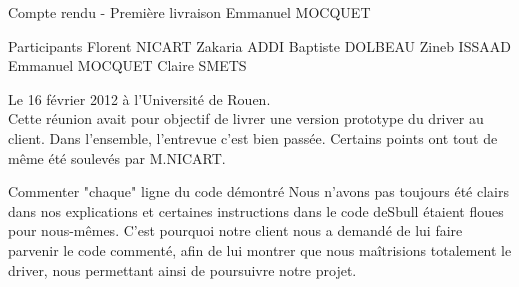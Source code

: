 Compte rendu - Première livraison
Emmanuel MOCQUET

Participants
Florent NICART
Zakaria ADDI
Baptiste DOLBEAU
Zineb ISSAAD
Emmanuel MOCQUET
Claire SMETS

Le 16 février 2012 à l'Université de Rouen.\\
Cette réunion avait pour objectif de livrer une version prototype du driver au client. Dans l'ensemble, l'entrevue c'est bien passée. Certains points ont tout de même été soulevés par M.NICART.

Commenter "chaque" ligne du code démontré
Nous n'avons pas toujours été clairs dans nos explications et certaines instructions dans le code de\og Sbull \fg{} étaient floues pour nous-mêmes. C'est pourquoi notre client nous a demandé de lui faire parvenir le code commenté, afin de lui montrer que nous maîtrisions totalement le driver, nous permettant ainsi de poursuivre notre projet.




